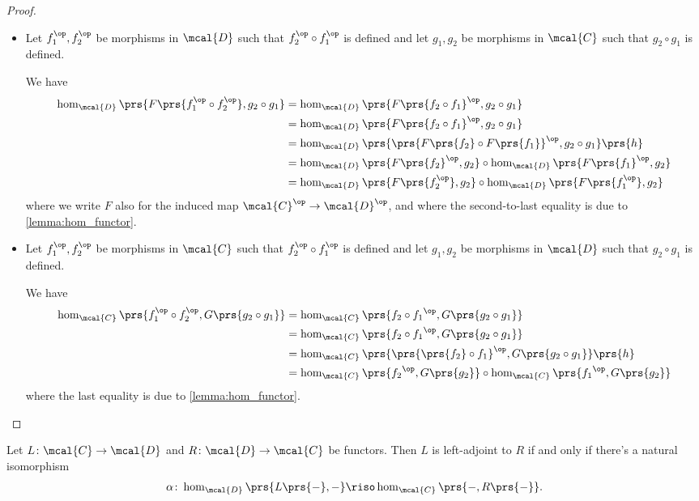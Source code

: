 \documentclass[10pt]{article}
\begin{document}
\begin{solution}
\begin{proof}
\begin{itemize}
\item Let $f_1^\op, f_2^\op$ be morphisms in $\mcal{D}$ such that $f_2^\op \circ f_1^\op$ is defined and let $g_1, g_2$ be morphisms in $\mcal{C}$ such that $g_2 \circ g_1$ is defined.

We have
\begin{align*}
\hom_{\mcal{D}}\prs{F\prs{f_1^\op \circ f_2^\op}, g_2 \circ g_1}
&=
\hom_{\mcal{D}}\prs{F\prs{f_2 \circ f_1}^\op, g_2 \circ g_1}
\\&=
\hom_{\mcal{D}}\prs{F\prs{f_2 \circ f_1}^\op, g_2 \circ g_1}
\\&=
\hom_{\mcal{D}}\prs{\prs{F\prs{f_2} \circ F\prs{f_1}}^\op, g_2 \circ g_1}\prs{h}
\\&=
\hom_{\mcal{D}}\prs{F\prs{f_2}^\op, g_2} \circ \hom_{\mcal{D}}\prs{F\prs{f_1}^\op, g_2}
\\&=
\hom_{\mcal{D}}\prs{F\prs{f_2^\op}, g_2} \circ \hom_{\mcal{D}}\prs{F\prs{f_1^\op}, g_2}
\end{align*}
where we write $F$ also for the induced map $\mcal{C}^\op \to \mcal{D}^\op$, and where the second-to-last equality is due to \eqref{lemma:hom_functor}.

\item Let $f_1^\op, f_2^\op$ be morphisms in $\mcal{C}$ such that $f_2^\op \circ f_1^\op$ is defined and let $g_1, g_2$ be morphisms in $\mcal{D}$ such that $g_2 \circ g_1$ is defined.

We have
\begin{align*}
\hom_{\mcal{C}}\prs{{f_1^\op \circ f_2^\op}, G\prs{g_2 \circ g_1}}
&=
\hom_{\mcal{C}}\prs{{f_2 \circ f_1}^\op, G\prs{g_2 \circ g_1}}
\\&=
\hom_{\mcal{C}}\prs{{f_2 \circ f_1}^\op, G\prs{g_2 \circ g_1}}
\\&=
\hom_{\mcal{C}}\prs{\prs{\prs{f_2} \circ {f_1}}^\op, G\prs{g_2 \circ g_1}}\prs{h}
\\&=
\hom_{\mcal{C}}\prs{{f_2}^\op, G\prs{g_2}} \circ \hom_{\mcal{C}}\prs{{f_1}^\op, G\prs{g_2}}
\end{align*}
where the last equality is due to \eqref{lemma:hom_functor}.
\end{itemize}
\end{proof}


\begin{lemma}\label{lemma:adjunction_criterion}
Let $L \colon \mcal{C} \to \mcal{D}$ and $R \colon \mcal{D} \to \mcal{C}$ be functors. Then $L$ is left-adjoint to $R$ if and only if there's a natural isomorphism
\[\alpha \colon \hom_{\mcal{D}}\prs{L\prs{-}, -} \riso \hom_{\mcal{C}}\prs{-,R\prs{-}} \text{.}\]
\end{lemma}


\end{solution}
\end{document}
